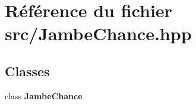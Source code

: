 \section{Référence du fichier src/\-Jambe\-Chance.hpp}
\label{_jambe_chance_8hpp}
\subsection*{Classes}
\begin{DoxyCompactItemize}
\item 
class {\bf Jambe\-Chance}
\end{DoxyCompactItemize}
